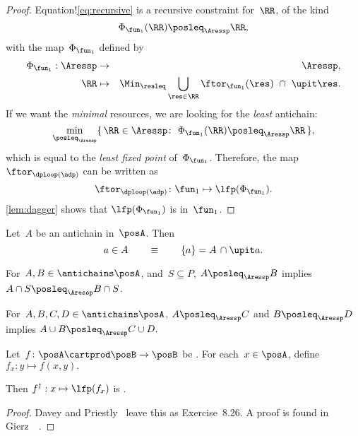 \begin{proof}
    Equation!\cref{eq:recursive} is a recursive constraint for~$\RR$,
    of the kind
    \begin{equation*}
        \Phi_{\fun_{1}}(\RR)\posleq_{\Aressp}\RR,
    \end{equation*}
    with the map~$\Phi_{\fun_{1}}$ defined by
    \begin{eqnarray}
        \Phi_{\fun_{1}}:\Aressp & \to & \Aressp,\label{eq:bigphi}\\
        \RR & \mapsto & \Min_{\resleq}\bigcup_{\res\in\RR}\ftor_{\fun_{1}}(\res)\ \cap\ \upit\res.\nonumber
    \end{eqnarray}
    If we want the \emph{minimal} resources, we are looking for the \emph{least}
    antichain:
    \begin{equation*}
        \min_{\posleq_{\Aressp}}\{\,\RR\in\Aressp\colon\ \Phi_{\fun_{1}}(\RR)\posleq_{\Aressp}\RR\,\},
    \end{equation*}
    which is equal to the \emph{least fixed point }of~$\Phi_{\fun_{1}}$.
    Therefore, the map $\ftor_{\dploop(\adp)}$ can be written as
    \begin{equation}
        \ftor_{\dploop(\adp)}\colon\fun_{1}\mapsto\lfp(\Phi_{\fun_{1}}).\label{eq:loop_fixpoint}
    \end{equation}
    \cref{lem:dagger} shows that $\lfp(\Phi_{\fun_{1}})$ is \scottcontinuous
    in~$\fun_{1}$.
\end{proof}

\begin{lemma}
    \label{lem:antichain-write}Let~$A$ be an antichain in~$\posA$.
    Then
    \begin{equation*}
        a\in A\qquad\equiv\qquad\{a\}=A\,\cap\upit a.
    \end{equation*}
\end{lemma}

\begin{lemma}
    \label{lem:antichain_inter}For~$A,B\in\antichains\posA$, and~$S\subseteq P$,
    $A\posleq_{\Aressp}B$ implies $A\cap S\posleq_{\Aressp}B\cap S$.
\end{lemma}

\begin{lemma}
    \label{lem:antichain_union}For~$A,B,C,D\in\antichains\posA$, $A\posleq_{\Aressp}C$
    and $B\posleq_{\Aressp}D$ implies $A\cup B\posleq_{\Aressp}C\cup D.$
\end{lemma}

\begin{lemma}
    \label{lem:dagger}Let~$f\colon\posA\cartprod\posB\to\posB$
    be \scottcontinuous.
    For each~$x\in\posA$, define $f_{x}:y\mapsto f(x,y).$
    
    Then $f^{\dagger}:x\mapsto\lfp(f_{x})$ is \scottcontinuous.
\end{lemma}
\begin{proof}
    Davey and Priestly~\cite{davey02} leave this as Exercise~8.26.
    A proof is found in Gierz~\etal~\cite[Exercise II-2.29]{gierz03continuous}.
\end{proof}

